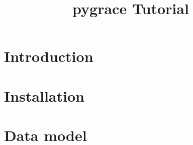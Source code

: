 \documentclass[11pt]{article}
\title{pygrace Tutorial}
\date{}
\begin{document}
\maketitle

\section*{Introduction}


\section*{Installation}


\section*{Data model}

\end{document}
